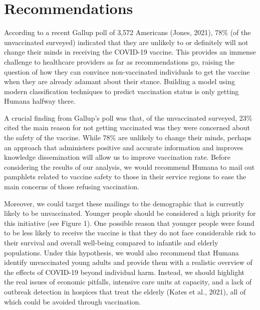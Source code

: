 \documentclass[
  12pt,
]{article}
\begin{document}
\normalsize

\doublespacing

\newpage

\hypertarget{recommendations}{%
\section{Recommendations}\label{recommendations}}

According to a recent Gallup poll of 3,572 Americans (Jones, 2021), 78\%
(of the unvaccinated surveyed) indicated that they are unlikely to or
definitely will not change their minds in receiving the COVID-19
vaccine. This provides an immense challenge to healthcare providers as
far as recommendations go, raising the question of how they can convince
non-vaccinated individuals to get the vaccine when they are already
adamant about their stance. Building a model using modern classification
techniques to predict vaccination status is only getting Humana halfway
there.

A crucial finding from Gallup's poll was that, of the unvaccinated
surveyed, 23\% cited the main reason for not getting vaccinated was they
were concerned about the safety of the vaccine. While 78\% are unlikely
to change their minds, perhaps an approach that administers positive and
accurate information and improves knowledge dissemination will allow us
to improve vaccination rate. Before considering the results of our
analysis, we would recommend Humana to mail out pamphlets related to
vaccine safety to those in their service regions to ease the main
concerns of those refusing vaccination.

Moreover, we could target these mailings to the demographic that is
currently likely to be unvaccinated. Younger people should be considered
a high priority for this initiative (see Figure 1). One possible reason
that younger people were found to be less likely to receive the vaccine
is that they do not face considerable risk to their survival and overall
well-being compared to infantile and elderly populations. Under this
hypothesis, we would also recommend that Humana identify unvaccinated
young adults and provide them with a realistic overview of the effects
of COVID-19 beyond individual harm. Instead, we should highlight the
real issues of economic pitfalls, intensive care units at capacity, and
a lack of outbreak detection in hospices that treat the elderly (Kates
et al., 2021), all of which could be avoided through vaccination.
\end{document}
